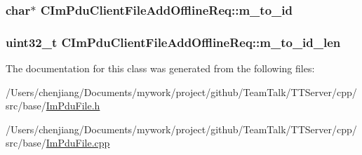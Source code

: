 \subsubsection[{m\+\_\+to\+\_\+id}]{\setlength{\rightskip}{0pt plus 5cm}char$\ast$ C\+Im\+Pdu\+Client\+File\+Add\+Offline\+Req\+::m\+\_\+to\+\_\+id\hspace{0.3cm}{\ttfamily [private]}}\label{class_c_im_pdu_client_file_add_offline_req_a57c210ecfdbfef4eb3912aeef27f31c2}
\hypertarget{class_c_im_pdu_client_file_add_offline_req_af9fc05c82fd007252c7ba53ba08a8a94}{}
\subsubsection[{m\+\_\+to\+\_\+id\+\_\+len}]{\setlength{\rightskip}{0pt plus 5cm}uint32\+\_\+t C\+Im\+Pdu\+Client\+File\+Add\+Offline\+Req\+::m\+\_\+to\+\_\+id\+\_\+len\hspace{0.3cm}{\ttfamily [private]}}\label{class_c_im_pdu_client_file_add_offline_req_af9fc05c82fd007252c7ba53ba08a8a94}


The documentation for this class was generated from the following files\+:\begin{DoxyCompactItemize}
\item 
/\+Users/chenjiang/\+Documents/mywork/project/github/\+Team\+Talk/\+T\+T\+Server/cpp/src/base/\hyperlink{_im_pdu_file_8h}{Im\+Pdu\+File.\+h}\item 
/\+Users/chenjiang/\+Documents/mywork/project/github/\+Team\+Talk/\+T\+T\+Server/cpp/src/base/\hyperlink{_im_pdu_file_8cpp}{Im\+Pdu\+File.\+cpp}\end{DoxyCompactItemize}
